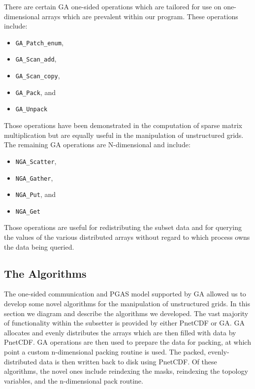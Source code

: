 There are certain GA one-sided operations which are tailored for use on
one-dimensional arrays which are prevalent within our program.  These
operations include:

\begin{itemize}
\item \verb=GA_Patch_enum=,
\item \verb=GA_Scan_add=,
\item \verb=GA_Scan_copy=,
\item \verb=GA_Pack=, and
\item \verb=GA_Unpack=
\end{itemize}

Those operations have been demonstrated in the computation of sparse matrix
multiplication\cite{GA} but are equally useful in the manipulation of
unstructured grids.  The remaining GA operations are N-dimensional and
include:

\begin{itemize}
\item \verb=NGA_Scatter=,
\item \verb=NGA_Gather=,
\item \verb=NGA_Put=, and
\item \verb=NGA_Get=
\end{itemize}

Those operations are useful for redistributing the subset data and for
querying the values of the various distributed arrays without regard to which
process owns the data being queried.

\subsection{The Algorithms}

The one-sided communication and PGAS model supported by GA allowed us to
develop some novel algorithms for the manipulation of unstructured grids.  In
this section we diagram and describe the algorithms we developed.  The vast
majority of functionality within the subsetter is provided by either PnetCDF
or GA.  GA allocates and evenly distributes the arrays which are then filled
with data by PnetCDF.  GA operations are then used to prepare the data for
packing, at which point a custom n-dimensional packing routine is used.  The
packed, evenly-distributed data is then written back to disk using PnetCDF.
Of these algorithms, the novel ones include reindexing the masks, reindexing
the topology variables, and the n-dimensional pack routine.

